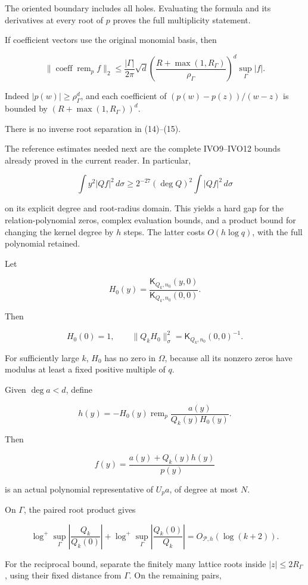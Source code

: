 \documentclass[11pt]{article}
\begin{document}
The oriented boundary includes all holes. Evaluating the formula and its derivatives at every root of \(p\) proves the full multiplicity statement.

If coefficient vectors use the original monomial basis, then

\[
\boxed{
\|\operatorname{coeff}\operatorname{rem}_pf\|_2
\le
\frac{|\Gamma|}{2\pi}\sqrt d
\left(\frac{R+\max(1,R_\Gamma)}{\rho_\Gamma}\right)^d
\sup_\Gamma|f|.
}
\tag{15}
\]

Indeed \(|p(w)|\ge\rho_\Gamma^d\), and each coefficient of \((p(w)-p(z))/(w-z)\) is bounded by \((R+\max(1,R_\Gamma))^d\).

There is no inverse root separation in (14)--(15).

The reference estimates needed next are the complete IVO9--IVO12 bounds already proved in the current reader. In particular,

\[
\int y^2|Qf|^2\,d\sigma
\ge 2^{-27}(\deg Q)^2
\int|Qf|^2\,d\sigma
\]

on its explicit degree and root-radius domain. This yields a hard gap for the relation-polynomial zeros, complex evaluation bounds, and a product bound for changing the kernel degree by \(h\) steps. The latter costs \(O(h\log q)\), with the full polynomial retained.

Let

\[
H_0(y)
=\frac{\mathsf K_{Q_k,n_0}(y,0)}
{\mathsf K_{Q_k,n_0}(0,0)}.
\]

Then

\[
H_0(0)=1,\qquad
\|Q_kH_0\|_\sigma^2
=\mathsf K_{Q_k,n_0}(0,0)^{-1}.
\]

For sufficiently large \(k\), \(H_0\) has no zero in \(\Omega\), because all its nonzero zeros have modulus at least a fixed positive multiple of \(q\).

Given \(\deg a<d\), define

\[
h(y)
=
-H_0(y)\operatorname{rem}_p
\frac{a(y)}{Q_k(y)H_0(y)}.
\]

Then

\[
\boxed{
f(y)=\frac{a(y)+Q_k(y)h(y)}{p(y)}
}
\tag{16}
\]

is an actual polynomial representative of \(U_pa\), of degree at most \(N\).

On \(\Gamma\), the paired root product gives

\[
\log^+\sup_\Gamma\left|\frac{Q_k}{Q_k(0)}\right|
+
\log^+\sup_\Gamma\left|\frac{Q_k(0)}{Q_k}\right|
=O_{\mathscr P,h}(\log(k+2)).
\tag{17}
\]

For the reciprocal bound, separate the finitely many lattice roots inside \(|z|\le2R_\Gamma\), using their fixed distance from \(\Gamma\). On the remaining pairs,
\end{document}
